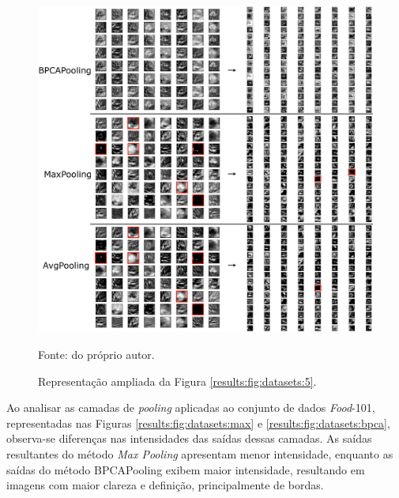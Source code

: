\begin{figure}[H]
    \centering
    \caption[Ampliação das camadas de \textit{pooling}]{Representação ampliada da Figura \ref{results:fig:datasets:5}.}
    \label{results:fig:datasets:5v2}
    \includegraphics[width=1\textwidth]{recursos/imagens/results/cifar_blocksv2.png}

    Fonte: do próprio autor.
\end{figure}



Ao analisar as camadas de \textit{pooling} aplicadas ao conjunto de dados \textit{Food}-101, representadas nas Figuras \ref{results:fig:datasets:max} e \ref{results:fig:datasets:bpca}, observa-se diferenças nas intensidades das saídas dessas camadas. As saídas resultantes do método \textit{Max Pooling} apresentam menor intensidade, enquanto as saídas do método BPCAPooling exibem maior intensidade, resultando em imagens com maior clareza e definição, principalmente de bordas.

